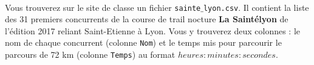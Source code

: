 \exer{[FIC-007]}
\setcounter{numques}{0}~\\


Vous trouverez sur le site de classe un fichier \texttt{sainte$\_$lyon.csv}.
Il contient la liste des 31 premiers concurrents de la course de trail nocture \textbf{La Saintélyon} de l'édition 2017 reliant Saint-Etienne à Lyon. 
Vous y trouverez deux colonnes : le nom de chaque concurrent (colonne \texttt{Nom}) et le temps mis pour parcourir le parcours de 72 km (colonne \texttt{Temps}) au format $heures:minutes:secondes$. 

